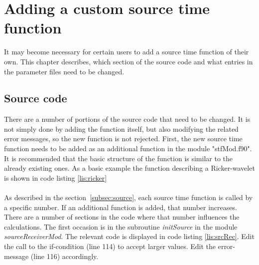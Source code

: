 \chapter{Adding a custom source time function}
\label{chap:addstf}
	It may become necessary for certain users to add a source time function of their own. This chapter describes, which section of the source code and what entries in the parameter files need to be changed.   
	\section{Source code}
	\label{sec:srcCode}
		There are a number of portions of the source code that need to be changed. It is not simply done by adding the function itself, but also modifying the related error messages, so the new function is not rejected. First, the new source time function needs to be added as an additional function in the module "stfMod.f90". It is recommended that the basic structure of the function is similar to the already existing ones. As a basic example the function describing a Ricker-wavelet is shown in code listing \ref{lis:ricker} \\
		 \\
    As described in the section~\ref{subsec:source}, each source time function is called by a specific number. If an additional function is added, that number increases. There are a number of sections in the code where that number influences the calculations. 
    The first occasion is in the subroutine \emph{initSource} in the module \emph{sourceReceiverMod}. The relevant code is displayed in code listing \ref{lis:srcRec}. Edit the call to the if-condition (line 114) to accept larger values. Edit the error-message (line 116) accordingly.
		
    
